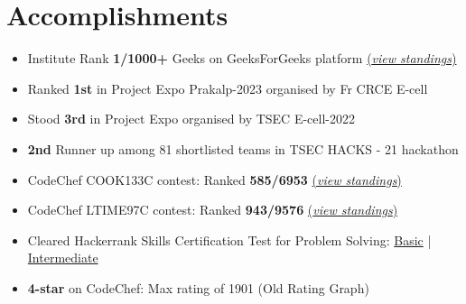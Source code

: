 \documentclass[a4,10pt]{article}
\newenvironment{zitemize}{
\begin{itemize}\itemsep0pt \parskip0pt \parsep1pt}
{\end{itemize}\vspace{-0.5cm}}
\begin{document}
\section{Accomplishments}
\begin{zitemize}
    \item  Institute Rank \textbf{1/1000+} Geeks on GeeksForGeeks platform \href{https://www.geeksforgeeks.org/colleges/thadomal-shahani-engineering-college-tsec-mumbai/students/}{(\textit{view standings})}
    \item Ranked \textbf{1st} in Project Expo Prakalp-2023 organised by Fr CRCE E-cell
    \item Stood \textbf{3rd} in Project Expo organised by TSEC E-cell-2022
    \item \textbf{2nd} Runner up among 81 shortlisted teams in TSEC HACKS - 21 hackathon 
    \item  CodeChef COOK133C contest: Ranked \textbf{585/6953} \href{https://www.codechef.com/rankings/COOK133C?itemsPerPage=100&order=asc&page=70&search=shyren_more&sortBy=rank}{(\textit{view standings})}
    \item  CodeChef LTIME97C contest: Ranked \textbf{943/9576} \href{https://www.codechef.com/rankings/LTIME97C?itemsPerPage=100&order=asc&page=70&search=shyren_more&sortBy=rank}{(\textit{view standings})}
    \item Cleared Hackerrank Skills Certification Test for Problem Solving:         
        \href{https://www.hackerrank.com/certificates/69fa323a6b13}{Basic} |
        \href{https://www.hackerrank.com/certificates/7be43b2d0925}{Intermediate} 
     
    
    \item \textbf{4-star} on CodeChef: Max rating of 1901 (Old Rating Graph)
    
    
    
    
    \end{zitemize}

\end{document}
